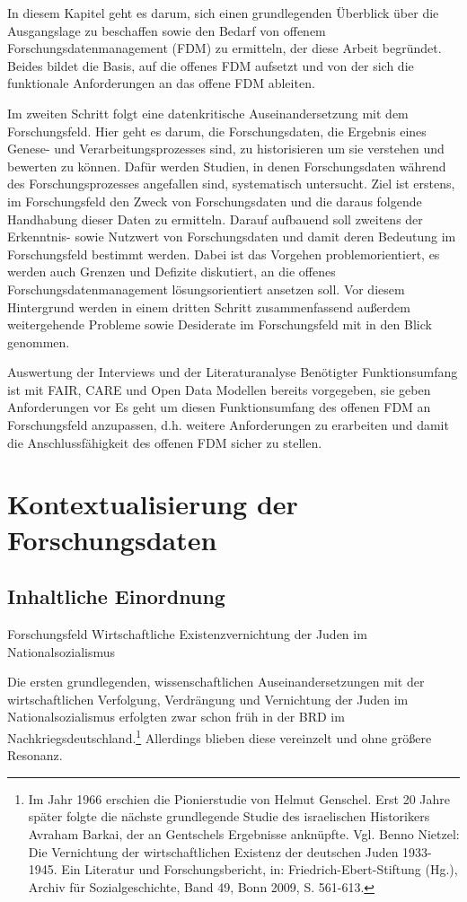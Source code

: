 \onehalfspacing

In diesem Kapitel geht es darum, sich einen grundlegenden Überblick über die Ausgangslage zu beschaffen sowie den Bedarf von offenem Forschungsdatenmanagement (FDM) zu ermitteln, der diese Arbeit begründet. Beides bildet die Basis, auf die offenes FDM aufsetzt und von der sich die funktionale Anforderungen an das offene FDM ableiten. 

Im zweiten Schritt folgt eine datenkritische Auseinandersetzung mit dem Forschungsfeld. Hier geht es darum, die Forschungsdaten, die Ergebnis eines Genese- und Verarbeitungsprozesses sind, zu historisieren um sie verstehen und bewerten zu können. Dafür werden Studien, in denen Forschungsdaten während des Forschungsprozesses angefallen sind, systematisch untersucht. Ziel ist erstens, im Forschungsfeld den Zweck von Forschungsdaten und die daraus folgende Handhabung dieser Daten zu ermitteln. Darauf aufbauend soll zweitens der Erkenntnis- sowie Nutzwert von Forschungsdaten und damit deren Bedeutung im Forschungsfeld bestimmt werden. Dabei ist das Vorgehen problemorientiert, es werden auch Grenzen und Defizite diskutiert, an die offenes Forschungsdatenmanagement lösungsorientiert ansetzen soll. Vor diesem Hintergrund werden in einem dritten Schritt zusammenfassend außerdem weitergehende Probleme sowie Desiderate im Forschungsfeld mit in den Blick genommen.

Auswertung der Interviews und der Literaturanalyse
Benötigter Funktionsumfang ist mit FAIR, CARE und Open Data Modellen bereits vorgegeben, sie geben Anforderungen vor
Es geht um diesen Funktionsumfang des offenen FDM an Forschungsfeld anzupassen, d.h. weitere Anforderungen zu erarbeiten und damit die Anschlussfähigkeit des offenen FDM sicher zu stellen.


\section{Kontextualisierung der Forschungsdaten}
\subsection{Inhaltliche Einordnung}

Forschungsfeld Wirtschaftliche Existenzvernichtung der Juden im Nationalsozialismus

Die ersten grundlegenden, wissenschaftlichen Auseinandersetzungen mit der wirtschaftlichen Verfolgung, Verdrängung und Vernichtung der Juden im Nationalsozialismus erfolgten zwar schon früh in der BRD im Nachkriegsdeutschland.\footnote{Im Jahr 1966 erschien die Pionierstudie von Helmut Genschel. Erst 20 Jahre später folgte die nächste grundlegende Studie des israelischen Historikers Avraham Barkai, der an Gentschels Ergebnisse anknüpfte. Vgl. Benno Nietzel: Die Vernichtung der wirtschaftlichen Existenz der deutschen Juden 1933-1945. Ein Literatur und Forschungsbericht, in: Friedrich-Ebert-Stiftung (Hg.), Archiv für Sozialgeschichte, Band 49, Bonn 2009, S. 561-613.} Allerdings blieben diese vereinzelt und ohne größere Resonanz. 

